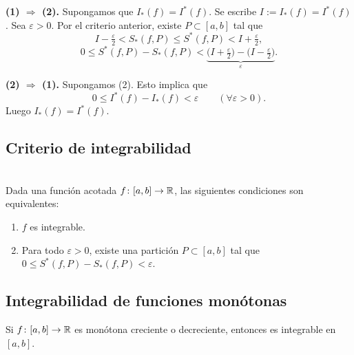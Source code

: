 \documentclass[11pt,a4paper]{article}
\begin{document}
\begin{demo}
\textbf{(1) $\Rightarrow$ (2).} Supongamos que $I_*(f)=I^*(f)$. Se escribe $I:=I_*(f)=I^*(f)$.
Sea $\varepsilon>0$. Por el criterio anterior, existe $P\subset[a,b]$ tal que
\[
  I-\tfrac{\varepsilon}{2}<S_*(f,P)\le S^*(f,P)<I+\tfrac{\varepsilon}{2},
\]
\[
  0\le S^*(f,P)-S_*(f,P)<\underbrace{\bigl(I+\tfrac{\varepsilon}{2}\bigr)-\bigl(I-\tfrac{\varepsilon}{2}\bigr)}_{\varepsilon}.
\]

\textbf{(2) $\Rightarrow$ (1).} Supongamos (2). Esto implica que
\[
  0\le I^*(f)-I_*(f)<\varepsilon \qquad (\forall\varepsilon>0).
\]
Luego $I_*(f)=I^*(f)$.
\end{demo}


\subsection{Criterio de integrabilidad}

\begin{proposicion}\mbox{}\\
Dada una función acotada $f\colon[a,b]\to\mathbb{R}$, las siguientes condiciones son equivalentes:
\begin{enumerate}
  \item $f$ es integrable.
  \item Para todo $\varepsilon>0$, existe una partición $P\subset[a,b]$ tal que $0\le S^*(f,P)-S_*(f,P)<\varepsilon$.
\end{enumerate}
\end{proposicion}

\subsection{Integrabilidad de funciones monótonas}

\begin{teorema}
Si $f\colon[a,b]\to\mathbb{R}$ es monótona creciente o decreciente, entonces es integrable en $[a,b]$.
\end{teorema}
\end{document}
